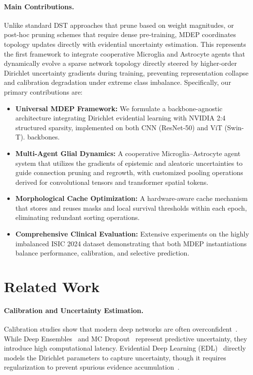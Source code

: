 \documentclass[letterpaper]{article} %
\begin{document}
\paragraph{Main Contributions.} Unlike standard DST approaches that prune based on weight magnitudes, or post-hoc pruning schemes that require dense pre-training, MDEP coordinates topology updates directly with evidential uncertainty estimation. This represents the first framework to integrate cooperative Microglia and Astrocyte agents that dynamically evolve a sparse network topology directly steered by higher-order Dirichlet uncertainty gradients during training, preventing representation collapse and calibration degradation under extreme class imbalance. Specifically, our primary contributions are:
\begin{itemize}
    \item \textbf{Universal MDEP Framework:} We formulate a backbone-agnostic architecture integrating Dirichlet evidential learning with NVIDIA 2:4 structured sparsity, implemented on both CNN (ResNet-50) and ViT (Swin-T). backbones.
    \item \textbf{Multi-Agent Glial Dynamics:} A cooperative Microglia--Astrocyte agent system that utilizes the gradients of epistemic and aleatoric uncertainties to guide connection pruning and regrowth, with customized pooling operations derived for convolutional tensors and transformer spatial tokens.
    \item \textbf{Morphological Cache Optimization:} A hardware-aware cache mechanism that stores and reuses masks and local survival thresholds within each epoch, eliminating redundant sorting operations.
    \item \textbf{Comprehensive Clinical Evaluation:} Extensive experiments on the highly imbalanced ISIC 2024 dataset demonstrating that both MDEP instantiations balance performance, calibration, and selective prediction.
\end{itemize}

\section{Related Work}\label{sec:related}

\paragraph{Calibration and Uncertainty Estimation.} Calibration studies show that modern deep networks are often overconfident~\cite{guo2017calibration, minderer2021revisiting}. While Deep Ensembles~\cite{lakshminarayanan2017simple} and MC Dropout~\cite{gal2016dropout} represent predictive uncertainty, they introduce high computational latency. Evidential Deep Learning (EDL)~\cite{sensoy2018evidential} directly models the Dirichlet parameters to capture uncertainty, though it requires regularization to prevent spurious evidence accumulation~\cite{shen2024mirage}.
\end{document}
